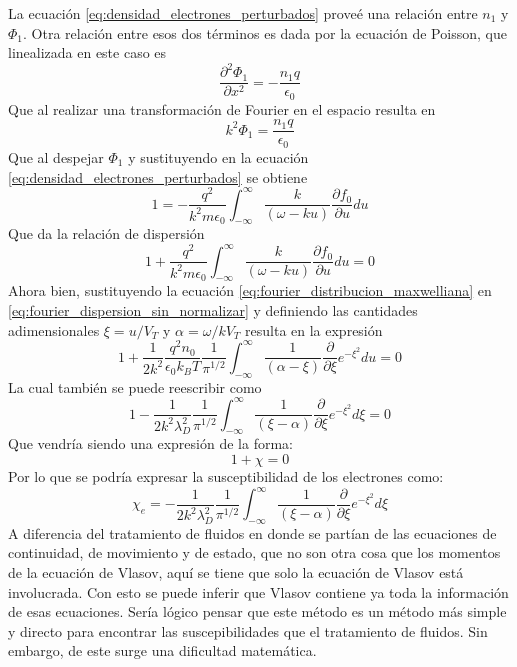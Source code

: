 \documentclass[../tesis_main_file.tex]{subfile}
\begin{document}
La ecuación \ref{eq:densidad_electrones_perturbados} proveé una relación entre $n_1$ y $\Phi _1$. Otra relación entre esos dos términos es dada por la ecuación de Poisson, que linealizada en este caso es
\begin{equation}
\frac{\partial ^2 \Phi _1}{\partial x^2}=-\frac{n_1 q}{\epsilon _0}
\end{equation}
Que al realizar una transformación de Fourier en el espacio resulta en
\begin{equation}
k^2\Phi_1 = \frac{n_1 q}{\epsilon_0}
\end{equation}
Que al despejar $\Phi_1$ y sustituyendo en la ecuación \ref{eq:densidad_electrones_perturbados} se obtiene
\begin{equation}
1= - \frac{q^2}{k^2 m \epsilon_0}\int^{\infty}_{-\infty} \frac{k}{(\omega -ku)}\frac{\partial f_0}{\partial u}du
\end{equation}
Que da la relación de dispersión
\begin{equation}
\label{eq:fourier_dispersion_sin_normalizar}
1 + \frac{q^2}{k^2 m \epsilon_0}\int^{\infty}_{-\infty} \frac{k}{(\omega -ku)}\frac{\partial f_0}{\partial u}du=0
\end{equation}
Ahora bien, sustituyendo la ecuación \ref{eq:fourier_distribucion_maxwelliana} en \ref{eq:fourier_dispersion_sin_normalizar} y definiendo las cantidades adimensionales $\xi = u/V_T$ y $\alpha= \omega / k V_T$ resulta en la expresión
\begin{equation}
1+\frac{1}{2k^2}\frac{q^2n_0}{\epsilon_0 k_BT}\frac{1}{\pi ^{1/2}}\int^{\infty}_{-\infty}\frac{1}{(\alpha -\xi)}\frac{\partial}{\partial \xi}e^{-\xi ^2}du=0
\end{equation}
La cual también se puede reescribir como 
\begin{equation}
1 - \frac{1}{2k^2 \lambda _D^2}\frac{1}{\pi ^{1/2}}\int^{\infty}_{-\infty}\frac{1}{(\xi -\alpha)}\frac{\partial}{\partial \xi}e^{-\xi ^2}d\xi=0
\end{equation}
Que vendría siendo una expresión de la forma:
\begin{equation}
1 + \chi =0
\end{equation}
Por lo que se podría expresar la susceptibilidad de los electrones como:
\begin{equation}
\label{eq:susceptibilidad_Vlasov_fourier}
\chi_e = -\frac{1}{2k^2 \lambda _D^2}\frac{1}{\pi ^{1/2}}\int^{\infty}_{-\infty}\frac{1}{(\xi -\alpha)}\frac{\partial}{\partial \xi}e^{-\xi ^2}d\xi
\end{equation}
A diferencia del tratamiento de fluidos en donde se partían  de las ecuaciones de continuidad, de movimiento y de estado, que no son otra cosa que los momentos de la ecuación de Vlasov, aquí se tiene que solo la ecuación de Vlasov está involucrada. Con esto se puede inferir que Vlasov contiene ya toda la información de esas ecuaciones. Sería lógico pensar que este método es un método más simple y directo para encontrar las suscepibilidades que el tratamiento de fluidos. Sin embargo, de este surge una dificultad matemática.\\
\end{document}
